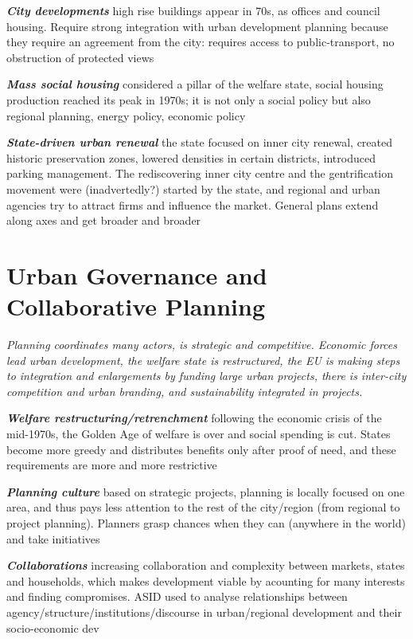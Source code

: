 \documentclass{article}
\newcommand{\bisection}[1]{\textbf{\textit{#1}}}
\newcommand{\alignedmarginpar}[1]{%
        \marginpar{\raggedright\small #1}
    }
\begin{document}
\bisection{City developments}\alignedmarginpar{Donau City} high rise buildings appear in 70s, as offices and council housing. Require strong integration with urban development planning because they require an agreement from the city: requires access to public-transport, no obstruction of protected views

\bisection{Mass social housing} considered a pillar of the welfare state, social housing production reached its peak in 1970s; it is not only a social policy but also regional planning, energy policy, economic policy

\bisection{State-driven urban renewal}\alignedmarginpar{Sweden's distinct housing regime} the state focused on inner city renewal, created historic preservation zones, lowered densities in certain districts, introduced parking management. The rediscovering inner city centre and the gentrification movement were (inadvertedly?) started by the state, and regional and urban agencies try to attract firms and influence the market. General plans extend along axes and get broader and broader

\pagebreak
\section{Urban Governance and Collaborative Planning}

\textit{Planning coordinates many actors, is strategic and competitive. Economic forces lead urban development, the welfare state is restructured, the EU is making steps to integration and enlargements by funding large urban projects, there is inter-city competition and urban branding, and sustainability integrated in projects.}

\bisection{Welfare restructuring/retrenchment} following the economic crisis of the mid-1970s, the Golden Age of welfare is over and social spending is cut. States become more greedy and distributes benefits only after proof of need, and these requirements are more and more restrictive

\bisection{Planning culture} based on strategic projects, planning is locally focused on one area, and thus pays less attention to the rest of the city/region (from regional to project planning). Planners grasp chances when they can (anywhere in the world) and take initiatives

\bisection{Collaborations} increasing  collaboration and complexity between markets, states and households, which makes development viable by acounting for many interests and finding compromises. ASID used to analyse relationships between agency/structure/institutions/discourse in urban/regional development and their socio-economic dev
\end{document}
